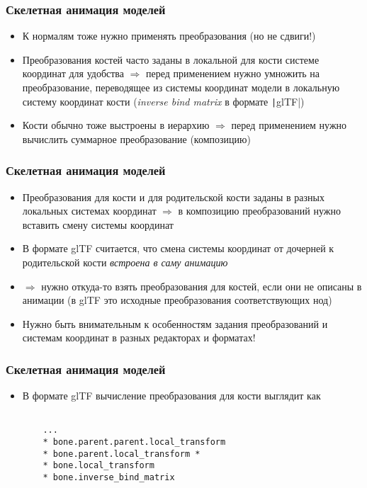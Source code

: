 \documentclass[10pt]{beamer}
\begin{document}
\begin{frame}[fragile]
\frametitle{Скелетная анимация моделей}
\begin{itemize}
\item К нормалям тоже нужно применять преобразования (но не сдвиги!)
\pause
\item Преобразования костей часто заданы в локальной для кости системе координат для удобства \begin{math}\Longrightarrow\end{math} перед применением нужно умножить на преобразование, переводящее из системы координат модели в локальную систему координат кости (\textit{inverse bind matrix} в формате \texttt|glTF|)
\pause
\item Кости обычно тоже выстроены в иерархию \begin{math}\Longrightarrow\end{math} перед применением нужно вычислить суммарное преобразование (композицию)
\end{itemize}
\end{frame}

\begin{frame}[fragile]
\frametitle{Скелетная анимация моделей}
\begin{itemize}
\item Преобразования для кости и для родительской кости заданы в разных локальных системах координат \begin{math}\Longrightarrow\end{math} в композицию преобразований нужно вставить смену системы координат
\pause
\item В формате glTF считается, что смена системы координат от дочерней к родительской кости \textit{встроена в саму анимацию}
\pause
\item \begin{math}\Longrightarrow\end{math} нужно откуда-то взять преобразования для костей, если они не описаны в анимации (в glTF это исходные преобразования соответствующих нод)
\pause
\item Нужно быть внимательным к особенностям задания преобразований и системам координат в разных редакторах и форматах!
\end{itemize}
\end{frame}

\begin{frame}[fragile]
\frametitle{Скелетная анимация моделей}
\begin{itemize}
\item В формате glTF вычисление преобразования для кости выглядит как
\begin{verbatim}

    ...
    * bone.parent.parent.local_transform
    * bone.parent.local_transform *
    * bone.local_transform
    * bone.inverse_bind_matrix
\end{verbatim}
\end{itemize}
\end{frame}
\end{document}
